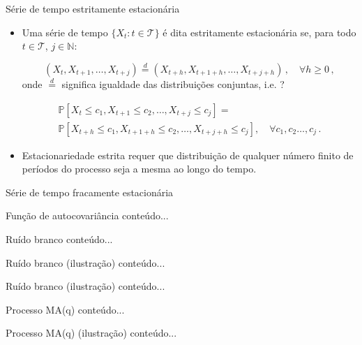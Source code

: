 \documentclass[11pt]{beamer}
\begin{document}
	\begin{frame}{Série de tempo estritamente estacionária}
		\begin{itemize}
			\item Uma série de tempo $\{X_t: t \in \mathcal{T}\}$ é dita estritamente estacionária se, para todo $t \in \mathcal{T}$, $j\in \mathbb{N}$:
			
			$$(X_t, X_{t+1}, \ldots, X_{t+j}) \overset{d}{=} (X_{t+h}, X_{t+1+h}, \ldots, X_{t+j+h})\,, \quad \forall h \geq 0 \, , $$
			onde $\overset{d}{=}$ significa igualdade das distribuições conjuntas, i.e. ?
			
			\begin{align*}
				\mathbb{P}[X_t \leq c_1, X_{t+1} \leq c_2, \ldots, X_{t+j} \leq c_j ] = \\ \mathbb{P}[X_{t+h} \leq c_1, X_{t+1+h} \leq c_2, \ldots, X_{t+j+h} \leq c_j ], \quad \forall c_1,c_2\ldots, c_j \, .
			\end{align*}
			
			\item Estacionariedade estrita requer que distribuição de qualquer número finito de períodos do processo seja a mesma ao longo do tempo.
		\end{itemize}
	\end{frame}
	
		\begin{frame}{Série de tempo fracamente estacionária}

	\end{frame}
	
	\begin{frame}{Função de autocovariância}
		conteúdo...
	\end{frame}
	
	\begin{frame}{Ruído branco}
		conteúdo...
	\end{frame}
	
	
	\begin{frame}{Ruído branco (ilustração)}
		conteúdo...
	\end{frame}
	
	
	\begin{frame}{Ruído branco (ilustração)}
		conteúdo...
	\end{frame}
	
		\begin{frame}{Processo MA(q)}
		conteúdo...
	\end{frame}
	
	\begin{frame}{Processo MA(q) (ilustração)}
		conteúdo...
	\end{frame}
	
\end{document}

